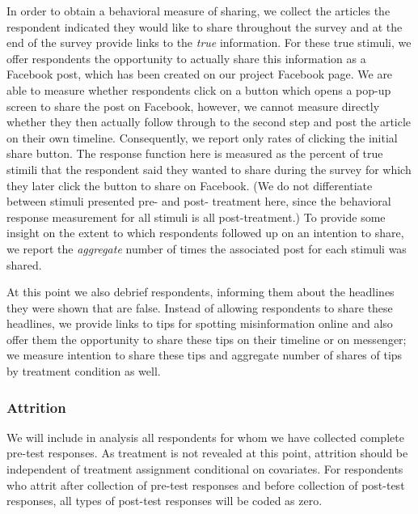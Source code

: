 \documentclass[letterpaper, 12pt, parskip=full,]{scrartcl}
\begin{document}
In order to obtain a behavioral measure of sharing, we collect the articles the respondent indicated they would like to share throughout the survey and at the end of the survey provide links to the \textit{true} information. For these true stimuli, we offer respondents the opportunity to actually share this information as a Facebook post, which has been created on our project Facebook page. We are able to measure whether respondents click on a button which opens a pop-up screen to share the post on Facebook, however, we cannot measure directly whether they then actually follow through to the second step and post the article on their own timeline. Consequently, we report only rates of clicking the initial share button. The response function here is measured as the percent of true stimili that the respondent said they wanted to share during the survey for which they later click the button to share on Facebook. (We do not differentiate between stimuli presented pre- and post- treatment here, since the behavioral response measurement for all stimuli is all post-treatment.) To provide some insight on the extent to which respondents followed up on an intention to share, we report the \textit{aggregate} number of times the associated post for each stimuli was shared. %

At this point we also debrief respondents, informing them about the headlines they were shown that are false. Instead of allowing respondents to share these headlines, we provide links to tips for spotting misinformation online and also offer them the opportunity to share these tips on their timeline or on messenger; we measure intention to share these tips and aggregate number of shares of tips by treatment condition as well. 


\subsubsection{Attrition} We will include in analysis all respondents for whom we have collected complete pre-test responses. As treatment is not revealed at this point, attrition should be independent of treatment assignment conditional on covariates. For respondents who attrit after collection of pre-test responses and before collection of post-test responses, all types of post-test responses will be coded as zero.
\end{document}
